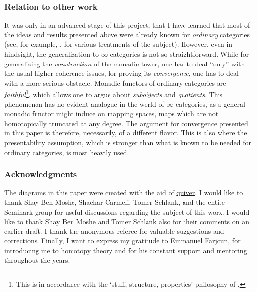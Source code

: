 \documentclass[12pt]{article}
\begin{document}
\subsubsection{Relation to other work}
It was only in an advanced stage of this project, that I have learned that most of the ideas and results presented above were already known for \textit{ordinary} categories (see, for example, \cite{applegate1970iterated,dubuc2006kan,macdonald1982tower,adamek1989monadic}, for various treatments of the subject). However, even in hindsight, the generalization to $\infty$-categories is not so straightforward. While for generalizing the \textit{construction} of the monadic tower, one has to deal ``only'' with the usual higher coherence issues, for proving its \textit{convergence}, one has to deal with a more serious obstacle. Monadic functors of ordinary categories are \textit{faithful}\footnote{This is in accordance with the `stuff, structure, properties' philosophy of \cite[Section 2.4]{baez2010lectures}.}, which allows one to argue about \textit{subobjects} and \textit{quotients}. This phenomenon has no evident analogue in the world of  $\infty$-categories, as a general monadic functor might induce on mapping spaces, maps which are not homotopically truncated at any degree. The argument for convergence presented in this paper is therefore, necessarily, of a different flavor. This is also where the presentability assumption, which is stronger than what is known to be needed for ordinary categories, is most heavily used. 


\subsubsection{Acknowledgments}

The diagrams in this paper were created with the aid of
\href{https://q.uiver.app/}{quiver}. I would like to thank Shay Ben Moshe, Shachar Carmeli, Tomer Schlank, and the entire Seminark group for useful discussions regarding the subject of this work. I would like to thank Shay Ben Moshe and Tomer Schlank also for their comments on an earlier draft. I thank the anonymous referee for valuable suggestions and corrections.  
Finally, I want to express my gratitude to Emmanuel Farjoun, for introducing me to homotopy theory and for his constant support and mentoring throughout the years. 
\end{document}
